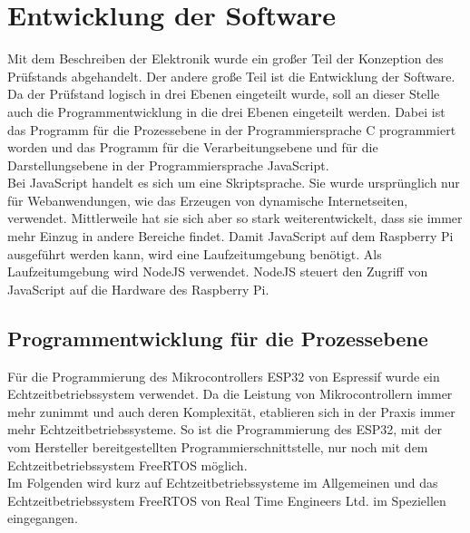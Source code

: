 \section{Entwicklung der Software}
Mit dem Beschreiben der Elektronik wurde ein großer Teil der Konzeption des Prüfstands abgehandelt. Der andere große Teil ist die Entwicklung der Software. Da der Prüfstand logisch in drei Ebenen eingeteilt wurde, soll an dieser Stelle auch die Programmentwicklung in die drei Ebenen eingeteilt werden. Dabei ist das Programm für die Prozessebene in der Programmiersprache C programmiert worden und das Programm für die Verarbeitungsebene und für die Darstellungsebene in der Programmiersprache JavaScript.
\\
Bei JavaScript handelt es sich um eine Skriptsprache. Sie wurde ursprünglich nur für Webanwendungen, wie das Erzeugen von dynamische Internetseiten, verwendet. Mittlerweile hat sie sich aber so stark weiterentwickelt, dass sie immer mehr Einzug in andere Bereiche findet. Damit JavaScript auf dem Raspberry Pi ausgeführt werden kann, wird eine Laufzeitumgebung benötigt. Als Laufzeitumgebung wird NodeJS verwendet. NodeJS steuert den Zugriff von JavaScript auf die Hardware des Raspberry Pi.
\cite{JavaScript}

\subsection{Programmentwicklung für die Prozessebene}
Für die Programmierung des Mikrocontrollers ESP32 von Espressif wurde ein Echtzeitbetriebssystem verwendet. Da die Leistung von Mikrocontrollern immer mehr zunimmt und auch deren Komplexität, etablieren sich in der Praxis immer mehr Echtzeitbetriebssysteme. So ist die Programmierung des ESP32, mit der vom Hersteller bereitgestellten Programmierschnittstelle, nur noch mit dem Echtzeitbetriebssystem FreeRTOS möglich.
\\
Im Folgenden wird kurz auf Echtzeitbetriebssysteme im Allgemeinen und das Echtzeitbetriebssystem FreeRTOS von Real Time Engineers Ltd. im Speziellen eingegangen.

